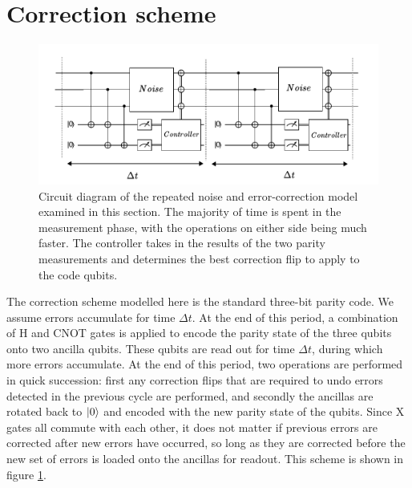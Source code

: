 \documentclass{report}
\begin{document}
\section{Correction scheme}
\begin{figure}[ht]
    \centering
    \includegraphics[scale = 0.9]{Figures/Circuit/diagram.pdf}
    \caption{Circuit diagram of the repeated noise and error-correction model examined in this section. The majority of time is spent in the measurement phase, with the operations on either side being much faster. The controller takes in the results of the two parity measurements and determines the best correction flip to apply to the code qubits.}
    \label{fig:circuitdiagram}
\end{figure}
    
The correction scheme modelled here is the standard three-bit parity code. We assume errors accumulate for time $\Delta t$. At the end of this period, a combination of H and CNOT gates is applied to encode the parity state of the three qubits onto two ancilla qubits. These qubits are read out for time $\Delta t$, during which more errors accumulate. At the end of this period, two operations are performed in quick succession: first any correction flips that are required to undo errors detected in the previous cycle are performed, and secondly the ancillas are rotated back to $\ket{0}$ and encoded with the new parity state of the qubits. Since X gates all commute with each other, it does not matter if previous errors are corrected after new errors have occurred, so long as they are corrected before the new set of errors is loaded onto the ancillas for readout. This scheme is shown in figure \ref{fig:circuitdiagram}.
\end{document}
